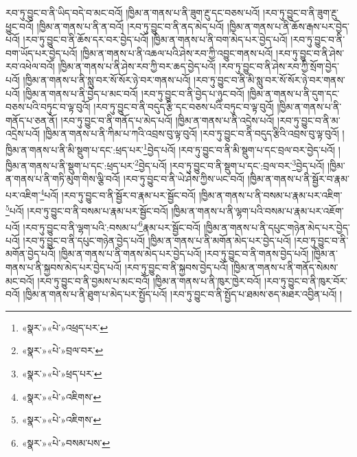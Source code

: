 རབ་ཏུ་བྱུང་བ་ནི་ཡིད་བདེ་བ་མང་བའོ། །ཁྱིམ་ན་གནས་པ་ནི་ཟུག་རྔུ་དང་བཅས་པའོ། །རབ་ཏུ་བྱུང་བ་ནི་ཟུག་རྔུ་ཕྱུང་བའོ། །ཁྱིམ་ན་གནས་པ་ནི་ན་བའོ། །རབ་ཏུ་བྱུང་བ་ནི་ནད་མེད་པའོ། །ཁྱིམ་ན་གནས་པ་ནི་ཆོས་རྒས་པར་བྱེད་པའོ། །རབ་ཏུ་བྱུང་བ་ནི་ཆོས་དར་བར་བྱེད་པའོ། །ཁྱིམ་ན་གནས་པ་ནི་བག་མེད་པར་བྱེད་པའོ། །རབ་ཏུ་བྱུང་བ་ནི་བག་ཡོད་པར་བྱེད་པའོ། །ཁྱིམ་ན་གནས་པ་ནི་འཆལ་པའི་ཤེས་རབ་ཀྱི་འབྱུང་གནས་པའོ། །རབ་ཏུ་བྱུང་བ་ནི་ཤེས་རབ་འཕེལ་བའོ། །ཁྱིམ་ན་གནས་པ་ནི་ཤེས་རབ་ཀྱི་བར་ཆད་བྱེད་པའོ། །རབ་ཏུ་བྱུང་བ་ནི་ཤེས་རབ་ཀྱི་སྲོག་བྱེད་པའོ། །ཁྱིམ་ན་གནས་པ་ནི་སླུ་བར་སོ་སོར་ཉེ་བར་གནས་པའོ། །རབ་ཏུ་བྱུང་བ་ནི་མི་སླུ་བར་སོ་སོར་ཉེ་བར་གནས་པའོ། །ཁྱིམ་ན་གནས་པ་ནི་བྱེད་པ་མང་བའོ། །རབ་ཏུ་བྱུང་བ་ནི་བྱེད་པ་ཉུང་བའོ། །ཁྱིམ་ན་གནས་པ་ནི་དུག་དང་བཅས་པའི་བཏུང་བ་ལྟ་བུའོ། །རབ་ཏུ་བྱུང་བ་ནི་བདུད་རྩི་དང་བཅས་པའི་བཏུང་བ་ལྟ་བུའོ། །ཁྱིམ་ན་གནས་པ་ནི་གནོད་པ་ཅན་ནོ། །རབ་ཏུ་བྱུང་བ་ནི་གནོད་པ་མེད་པའོ། །ཁྱིམ་ན་གནས་པ་ནི་འདྲེས་པའོ། །རབ་ཏུ་བྱུང་བ་ནི་མ་འདྲེས་པའོ། །ཁྱིམ་ན་གནས་པ་ནི་ཀིམ་པ་ཀའི་འབྲས་བུ་ལྟ་བུའོ། །རབ་ཏུ་བྱུང་བ་ནི་བདུད་རྩིའི་འབྲས་བུ་ལྟ་བུའོ། །ཁྱིམ་ན་གནས་པ་ནི་མི་སྡུག་པ་དང་:ཕྲད་པར་\footnote{«སྣར་»«པེ་»འཕྲད་པར་}བྱེད་པའོ། །རབ་ཏུ་བྱུང་བ་ནི་མི་སྡུག་པ་དང་བྲལ་བར་བྱེད་པའོ། །ཁྱིམ་ན་གནས་པ་ནི་སྡུག་པ་དང་:ཕྲད་པར་\footnote{«སྣར་»«པེ་»བྲལ་བར་}བྱེད་པའོ། །རབ་ཏུ་བྱུང་བ་ནི་སྡུག་པ་དང་:བྲལ་བར་\footnote{«སྣར་»«པེ་»ཕྲད་པར་}བྱེད་པའོ། །ཁྱིམ་ན་གནས་པ་ནི་གཏི་མུག་གིས་ལྕི་བའོ། །རབ་ཏུ་བྱུང་བ་ནི་ཡེ་ཤེས་ཀྱིས་ཡང་བའོ། །ཁྱིམ་ན་གནས་པ་ནི་སྦྱོར་བ་རྣམ་པར་འཇིག་\footnote{«སྣར་»«པེ་»འཇིགས་}པའོ། །རབ་ཏུ་བྱུང་བ་ནི་སྦྱོར་བ་རྣམ་པར་སྦྱོང་བའོ། །ཁྱིམ་ན་གནས་པ་ནི་བསམ་པ་རྣམ་པར་འཇིག་\footnote{«སྣར་»«པེ་»འཇིགས་}པའོ། །རབ་ཏུ་བྱུང་བ་ནི་བསམ་པ་རྣམ་པར་སྦྱོང་བའོ། །ཁྱིམ་ན་གནས་པ་ནི་ལྷག་པའི་བསམ་པ་རྣམ་པར་འཇོག་པའོ། །རབ་ཏུ་བྱུང་བ་ནི་ལྷག་པའི་:བསམ་པ་\footnote{«སྣར་»«པེ་»བསམ་པས་}རྣམ་པར་སྦྱོང་བའོ། །ཁྱིམ་ན་གནས་པ་ནི་དཔུང་གཉེན་མེད་པར་བྱེད་པའོ། །རབ་ཏུ་བྱུང་བ་ནི་དཔུང་གཉེན་བྱེད་པའོ། །ཁྱིམ་ན་གནས་པ་ནི་མགོན་མེད་པར་བྱེད་པའོ། །རབ་ཏུ་བྱུང་བ་ནི་མགོན་བྱེད་པའོ། །ཁྱིམ་ན་གནས་པ་ནི་གནས་མེད་པར་བྱེད་པའོ། །རབ་ཏུ་བྱུང་བ་ནི་གནས་བྱེད་པའོ། །ཁྱིམ་ན་གནས་པ་ནི་སྐྱབས་མེད་པར་བྱེད་པའོ། །རབ་ཏུ་བྱུང་བ་ནི་སྐྱབས་བྱེད་པའོ། །ཁྱིམ་ན་གནས་པ་ནི་གནོད་སེམས་མང་བའོ། །རབ་ཏུ་བྱུང་བ་ནི་བྱམས་པ་མང་བའོ། །ཁྱིམ་ན་གནས་པ་ནི་ཁུར་ཁྱེར་བའོ། །རབ་ཏུ་བྱུང་བ་ནི་ཁུར་བོར་བའོ། །ཁྱིམ་ན་གནས་པ་ནི་ཐུག་པ་མེད་པར་སྤྱོད་པའོ། །རབ་ཏུ་བྱུང་བ་ནི་སྤྱོད་པ་ཐམས་ཅད་མཐར་འབྱིན་པའོ། །
